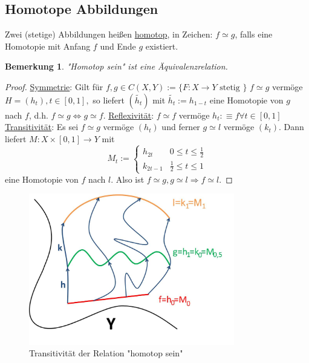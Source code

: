 \documentclass[a4paper,11pt,notitlepage]{report}
\newtheorem{remark}{Bemerkung}[chapter]
\newenvironment{Kasten}[1]
{
\hspace{0.05\linewidth}
\begin{center}
\begin{minipage}{0.9\linewidth}
\setlength{\fboxsep}{10pt}
\definecolor{shadecolor}{gray}{1}
\definecolor{framecolor}{gray}{0}
\def\FrameCommand{\fcolorbox{framecolor}{shadecolor}}
\MakeFramed {\FrameRestore}
\subsection{#1}
\begin{itshape}
}
{
\end{itshape}
\endMakeFramed
\end{minipage}
\end{center}
}
\begin{document}
\begin{Kasten}{Homotope Abbildungen}
	Zwei (stetige) Abbildungen heißen \underline{homotop}, in Zeichen: $f \simeq g$, falls eine Homotopie mit Anfang $f$ und Ende $g$ existiert.
\end{Kasten}

\begin{remark}
"Homotop sein" ist eine Äquivalenzrelation.
\end{remark}

\begin{proof}
	\underline{Symmetrie}:
	Gilt für $f,g \in C(X,Y) := \{F \colon X \rightarrow Y \text{ stetig } \}$ $f \simeq g$ vermöge $H=(h_t), t \in [0,1],$ so liefert $(\tilde{h_t})$ mit $\tilde{h_t}:=h_{1-t}$ eine Homotopie von $g$ nach $f$, d.h. $f \simeq g \Leftrightarrow g \simeq f$.
	\newline
	\underline{Reflexivität}:
	$f \simeq f$ vermöge $h_t : \equiv f \forall t \in [0,1]$
	\newline
	\underline{Transitivität}:
	Es sei $f \simeq g$ vermöge $(h_t)$ und ferner $g \simeq l$ vermöge $(k_t)$.
	Dann liefert $M \colon X \times [0,1] \rightarrow Y$ mit
	$$M_t := \begin{cases} h_{2t} & 0 \leq t \leq \frac{1}{2} \\
	k_{2t-1} & \frac{1}{2} \leq t \leq 1
	\end{cases}$$
	eine Homotopie von $f$ nach $l$.
	\newline
	Also ist $f \simeq g, g \simeq l \Rightarrow f \simeq l$.
\end{proof}

\begin{figure}[h]
\centering
\includegraphics[width=0.8\textwidth]{images/Homotopie_Transitivitaet.jpg}
\caption{Transitivität der Relation "homotop sein"}
\end{figure}
\end{document}
